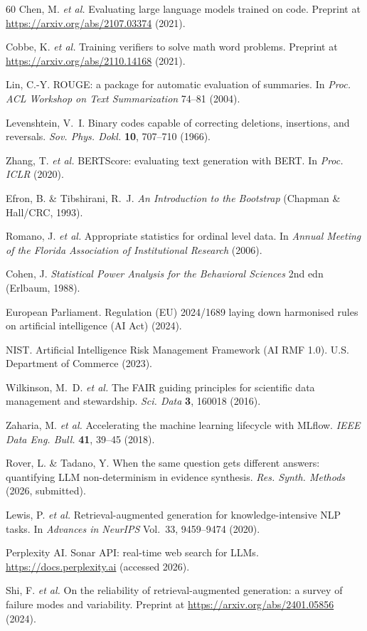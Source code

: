 \documentclass[sn-nature]{sn-jnl}
\begin{document}
\begin{thebibliography}{60}
Chen, M. \emph{et al.}
Evaluating large language models trained on code.
Preprint at \url{https://arxiv.org/abs/2107.03374} (2021).

Cobbe, K. \emph{et al.}
Training verifiers to solve math word problems.
Preprint at \url{https://arxiv.org/abs/2110.14168} (2021).

Lin, C.-Y.
ROUGE: a package for automatic evaluation of summaries.
In \emph{Proc. ACL Workshop on Text Summarization} 74--81 (2004).

Levenshtein, V.~I.
Binary codes capable of correcting deletions, insertions, and reversals.
\emph{Sov. Phys. Dokl.} \textbf{10}, 707--710 (1966).

Zhang, T. \emph{et al.}
BERTScore: evaluating text generation with BERT.
In \emph{Proc. ICLR} (2020).

Efron, B. \& Tibshirani, R.~J.
\emph{An Introduction to the Bootstrap} (Chapman \& Hall/CRC, 1993).

Romano, J. \emph{et al.}
Appropriate statistics for ordinal level data.
In \emph{Annual Meeting of the Florida Association of Institutional Research} (2006).

Cohen, J.
\emph{Statistical Power Analysis for the Behavioral Sciences} 2nd edn (Erlbaum, 1988).

European Parliament.
Regulation (EU) 2024/1689 laying down harmonised rules on artificial intelligence (AI Act) (2024).

NIST.
Artificial Intelligence Risk Management Framework (AI RMF 1.0).
U.S. Department of Commerce (2023).

Wilkinson, M.~D. \emph{et al.}
The FAIR guiding principles for scientific data management and stewardship.
\emph{Sci. Data} \textbf{3}, 160018 (2016).

Zaharia, M. \emph{et al.}
Accelerating the machine learning lifecycle with MLflow.
\emph{IEEE Data Eng. Bull.} \textbf{41}, 39--45 (2018).

Rover, L. \& Tadano, Y.
When the same question gets different answers: quantifying LLM non-determinism in evidence synthesis.
\emph{Res. Synth. Methods} (2026, submitted).

Lewis, P. \emph{et al.}
Retrieval-augmented generation for knowledge-intensive NLP tasks.
In \emph{Advances in NeurIPS} Vol.~33, 9459--9474 (2020).

Perplexity AI.
Sonar API: real-time web search for LLMs.
\url{https://docs.perplexity.ai} (accessed 2026).

Shi, F. \emph{et al.}
On the reliability of retrieval-augmented generation: a survey of failure modes and variability.
Preprint at \url{https://arxiv.org/abs/2401.05856} (2024).

\end{thebibliography}
\end{document}
